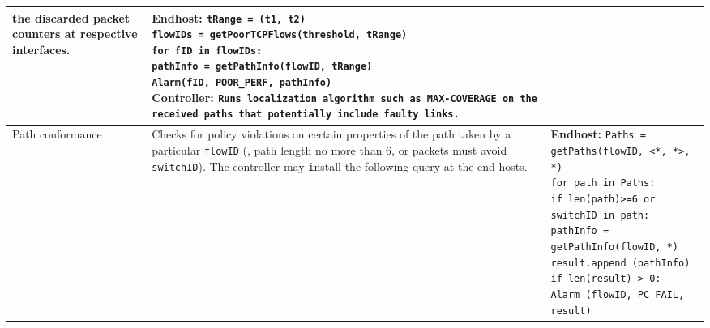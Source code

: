 \begin{table}[!h]
{\begin{tabular}{C{2cm} L{5cm} L{10cm}}
							 the discarded packet counters at respective interfaces.
						   &    \textbf{Endhost:} \newline
  								\texttt{tRange = (t1, t2) \newline
  								flowIDs = getPoorTCPFlows(threshold, tRange) \newline
								for fID in flowIDs: \newline
								\hspace{0.3cm} pathInfo = getPathInfo(flowID, tRange) \newline
								\hspace{0.3cm} Alarm(fID, POOR\_PERF, pathInfo) \newline }
								\textbf{Controller:} \newline
								\texttt{Runs localization algorithm such as MAX-COVERAGE
								on the received paths that potentially include faulty links.} \\
\midrule						
Path \newline
conformance~\cite{netsight,pathquery}	& 	Checks for policy violations on certain 												properties of the path taken by a particular 											{\tt flowID} (\eg, path length no more than $6$, 										or packets must avoid {\tt switchID}). The 												controller may {\texttt install} the following query									at the end-hosts.
					&   \textbf{Endhost:} \newline
						\texttt{Paths = getPaths(flowID, <*, *>, *) \newline
								for path in Paths: \newline
								\hspace{0.3cm} if len(path)>=6 or switchID in path: \newline
								\hspace{0.3cm} \hspace{0.2cm} pathInfo = getPathInfo(flowID, *) \newline
								\hspace{0.3cm} \hspace{0.2cm} result.append (pathInfo) \newline
								if len(result) > 0: \newline
								\hspace{0.3cm} Alarm (flowID, PC\_FAIL, result)  } \\

\end{tabular}}
\end{table}
